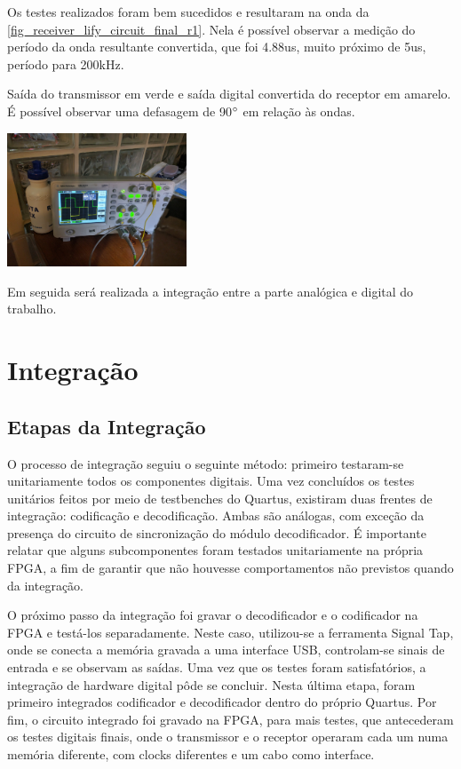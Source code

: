 	Os testes realizados foram bem sucedidos e resultaram na onda da \autoref{fig_receiver_lify_circuit_final_r1}. Nela é possível observar a medição do período da onda resultante convertida, que foi 4.88us, muito próximo de 5us, período para 200kHz.
	
	\begin{chart}[htb]
		\caption{\label{fig_receiver_lify_circuit_final_r1}Saída do transmissor em verde e saída digital convertida do receptor em amarelo. É possível observar uma defasagem de 90$\degree$ em relação às ondas.}
		\centering
		\includegraphics[width=0.4\textwidth, trim={36cm 30cm 60cm 40cm}, clip]{circuits/photos/TXRX_final_fixed.jpg}
	\end{chart}
	
	Em seguida será realizada a integração entre a parte analógica e digital do trabalho.

	\section{Integração}
	
	\subsection{Etapas da Integração}
	O processo de integração seguiu o seguinte método: primeiro testaram-se unitariamente todos os componentes digitais. Uma vez concluídos os testes unitários feitos por meio de testbenches do Quartus, existiram duas frentes de integração: codificação e decodificação. Ambas são análogas, com exceção da presença do circuito de sincronização do módulo decodificador. É importante relatar que alguns subcomponentes foram testados unitariamente na própria FPGA, a fim de garantir que não houvesse comportamentos não previstos quando da integração. 
	
	O próximo passo da integração foi gravar o decodificador e o codificador na FPGA e testá-los separadamente. Neste caso, utilizou-se a ferramenta Signal Tap, onde se conecta a memória gravada a uma interface USB, controlam-se sinais de entrada e se observam as saídas. Uma vez que os testes foram satisfatórios, a integração de hardware digital pôde se concluir. Nesta última etapa, foram primeiro integrados codificador e decodificador dentro do próprio Quartus. Por fim, o circuito integrado foi gravado na FPGA, para mais testes, que antecederam os testes digitais finais, onde o transmissor e o receptor operaram cada um numa memória diferente, com clocks diferentes e um cabo como interface.
	
